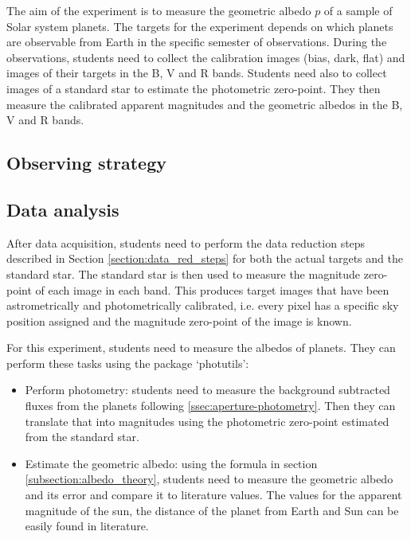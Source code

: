 \documentclass[a4paper, 11pt, fleqn]{memoir}
\begin{document}
The aim of the experiment is to measure the geometric albedo $p$ of a sample of Solar system planets.
The targets for the experiment depends on which planets are observable from Earth in the specific semester of observations.
During the observations, students need to collect the calibration images (bias, dark, flat) and images of their targets in the B, V and R bands.
Students need also to collect images of a standard star to estimate the photometric zero-point.
They then measure the calibrated apparent magnitudes and the geometric albedos in the B, V and R bands.

\subsection{Observing strategy}

\subsection{Data analysis}

After data acquisition, students need to perform the data reduction steps described in Section \ref{section:data_red_steps} for both the actual targets and the standard star.
The standard star is then used to measure the magnitude zero-point of each image in each band.
This produces target images that have been astrometrically and photometrically calibrated, i.e. every pixel has a specific sky position assigned and the magnitude zero-point of the image is known.

For this experiment, students need to measure the albedos of planets.
They can perform these tasks using the  package `photutils':
\begin{itemize}
    \item Perform photometry: students need to measure the background subtracted fluxes from the planets following \cref{ssec:aperture-photometry}.
          Then they can translate that into magnitudes using the photometric zero-point estimated from the standard star.
    \item
          Estimate the geometric albedo: using the formula in section
          \ref{subsection:albedo_theory}, students need to measure the geometric albedo
          and its error and compare it to literature values.
          The values for the apparent magnitude of the sun, the distance of the planet from Earth and Sun can be easily found in literature.
\end{itemize}
\end{document}
